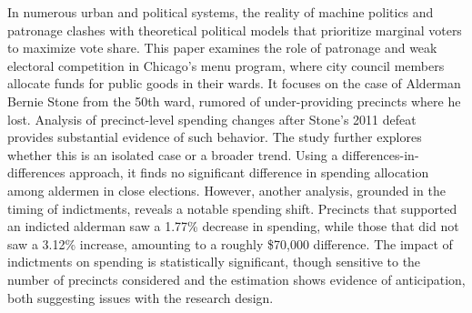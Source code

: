 \begin{spacing}{1.0}
    In numerous urban and political systems, the reality of machine politics and patronage clashes with theoretical political models that prioritize marginal voters to maximize vote share.
    This paper examines the role of patronage and weak electoral competition in Chicago's menu program, where city council members allocate funds for public goods in their wards.
    It focuses on the case of Alderman Bernie Stone from the 50th ward, rumored of under-providing precincts where he lost. Analysis of precinct-level spending changes after Stone's 2011 defeat provides substantial evidence of such behavior. 
    The study further explores whether this is an isolated case or a broader trend. 
    Using a differences-in-differences approach, it finds no significant difference in spending allocation among aldermen in close elections. 
    However, another analysis, grounded in the timing of indictments, reveals a notable spending shift. 
    Precincts that supported an indicted alderman saw a 1.77\% decrease in spending, while those that did not saw a 3.12\% increase, amounting to a roughly \$70,000 difference. 
    The impact of indictments on spending is statistically significant, though sensitive to the number of precincts considered and the estimation shows evidence of anticipation, both suggesting issues with the research design.
\end{spacing}